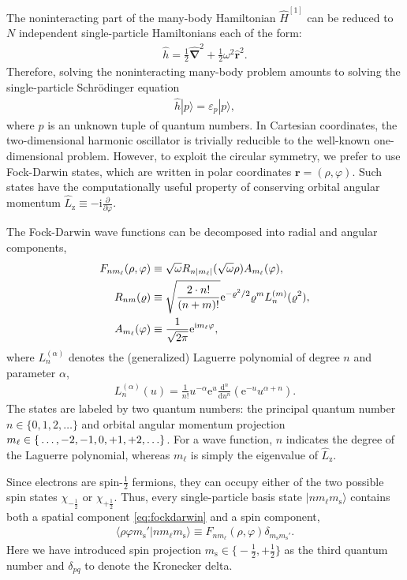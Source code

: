 The noninteracting part of the many-body Hamiltonian $\hat{H}^{[1]}$ can be reduced to $N$ independent single-particle Hamiltonians each of the form:
\begin{align*}
  \hat{h} = \frac{1}{2} \hat{\bm{\nabla}}^2 + \frac{1}{2} \omega^2 \hat{\bm{r}}^2.
\end{align*}
Therefore, solving the noninteracting many-body problem amounts to solving the single-particle Schr\"odinger equation
\begin{align*}
  \hat{h} |p\rangle = \varepsilon_p |p\rangle,
\end{align*}
where $p$ is an unknown tuple of quantum numbers.  In Cartesian coordinates, the two-dimensional harmonic oscillator is trivially reducible to the well-known one-dimensional problem.  However, to exploit the circular symmetry, we prefer to use Fock-Darwin states, which are written in polar coordinates $\bm{r} = (\rho, \varphi)$.  Such states have the computationally useful property of conserving orbital angular momentum $\hat{L}_{\mathrm{z}} \equiv -\mathrm{i} \frac{\partial}{\partial \varphi}$.

The Fock-Darwin wave functions can be decomposed into radial and angular components,\cite{lohne2010coupled}
\begin{align}
  F_{n m_\ell}(\rho, \varphi) &\equiv \sqrt\omega R_{n |m_\ell|}(\sqrt \omega \rho) A_{m_\ell}(\varphi) \label{eq:fockdarwin}, \\
  R_{n m}(\varrho) &\equiv \sqrt{\frac{2 \cdot n!}{(n + m)!}} \mathrm{e}^{-\varrho^2 / 2} \varrho^m L_n^{(m)}(\varrho^2), \notag \\
  A_{m_\ell}(\varphi) &\equiv \frac{1}{\sqrt{2 \pi}} \mathrm{e}^{\mathrm{i} m_\ell \varphi}, \notag
\end{align}
where $L_n^{(\alpha)}$ denotes the (generalized) Laguerre polynomial \cite{NIST:DLMF} of degree $n$ and parameter $\alpha$,
\begin{align*}
  L_n^{(\alpha)}(u) = \frac{1}{n!} u^{-\alpha} \mathrm{e}^u \frac{\mathrm{d}^n}{\mathrm{d} u^n} (\mathrm{e}^{-u} u^{\alpha + n}).
\end{align*}
The states are labeled by two quantum numbers: the principal quantum number $n \in \{0, 1, 2, \ldots\}$ and orbital angular momentum projection $m_\ell \in \mathbb \{\ldots, -2, -1, 0, +1, +2, \ldots\}$.  For a wave function, $n$ indicates the degree of the Laguerre polynomial, whereas $m_\ell$ is simply the eigenvalue of $\hat{L}_{\mathrm{z}}$.

Since electrons are spin-$\frac{1}{2}$ fermions, they can occupy either of the two possible spin states $\chi_{-\frac{1}{2}}$ or $\chi_{+\frac{1}{2}}$.  Thus, every single-particle basis state $|n m_\ell m_{\mathrm{s}}\rangle$ contains both a spatial component \eqref{eq:fockdarwin} and a spin component,
\begin{align} \label{eq:singleparticlestate}
  \langle \rho \varphi m_{\mathrm{s}}' |n m_\ell m_{\mathrm{s}}\rangle \equiv F_{n m_\ell}(\rho, \varphi) \delta_{m_{\mathrm{s}}^{} m_{\mathrm{s}}'}.
\end{align}
Here we have introduced spin projection $m_{\mathrm{s}} \in \bigl\{-\frac{1}{2}, +\frac{1}{2}\bigr\}$ as the third quantum number and $\delta_{p q}$ to denote the Kronecker delta.

